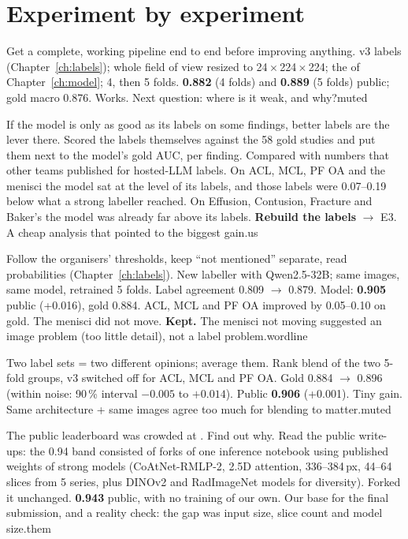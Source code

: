 \section{Experiment by experiment}

  {Get a complete, working pipeline end to end before improving anything.}
  {v3 labels (Chapter~\ref{ch:labels}); whole field of view resized to 24\,$\times$\,224\,$\times$\,224; the
    of Chapter~\ref{ch:model}; 4, then 5 folds.}
  {\textbf{0.882} (4 folds) and \textbf{0.889} (5 folds) public; gold macro 0.876.}
  {Works. Next question: where is it weak, and why?}{muted}

  {If the model is only as good as its labels on some findings, better labels are the lever there.}
  {Scored the labels themselves against the 58 gold studies and put them next to the model's gold AUC, per finding.
   Compared with numbers that other teams published for hosted-LLM labels.}
  {On ACL, MCL, PF OA and the menisci the model sat at the level of its labels, and those labels were 0.07--0.19 below
   what a strong labeller reached. On Effusion, Contusion, Fracture and Baker's the model was already far above its
   labels.}
  {\textbf{Rebuild the labels} $\rightarrow$ E3. A cheap analysis that pointed to the biggest gain.}{us}

  {Follow the organisers' thresholds, keep ``not mentioned'' separate, read probabilities (Chapter~\ref{ch:labels}).}
  {New labeller with Qwen2.5-32B; same images, same model, retrained 5 folds.}
  {Label agreement 0.809 $\rightarrow$ 0.879. Model: \textbf{0.905} public (+0.016), gold 0.884. ACL, MCL and PF OA
   improved by 0.05--0.10 on gold. The menisci did not move.}
  {\textbf{Kept.} The menisci not moving suggested an image problem (too little detail), not a label problem.}{wordline}

  {Two label sets = two different opinions; average them.}
  {Rank blend of the two 5-fold groups, v3 switched off for ACL, MCL and PF OA.}
  {Gold 0.884 $\rightarrow$ 0.896 (within noise: 90\,\% interval $-0.005$ to $+0.014$). Public \textbf{0.906} (+0.001).}
  {Tiny gain. Same architecture + same images agree too much for blending to matter.}{muted}

  {The public leaderboard was crowded at . Find out why.}
  {Read the public write-ups: the 0.94 band consisted of forks of one inference notebook using published weights
   of strong models (CoAtNet-RMLP-2, 2.5D attention, 336--384\,px, 44--64 slices from 5 series, plus DINOv2 and
   RadImageNet models for diversity). Forked it unchanged.}
  {\textbf{0.943} public, with no training of our own.}
  {Our base for the final submission, and a reality check: the gap was input size, slice count and model size.}{them}

